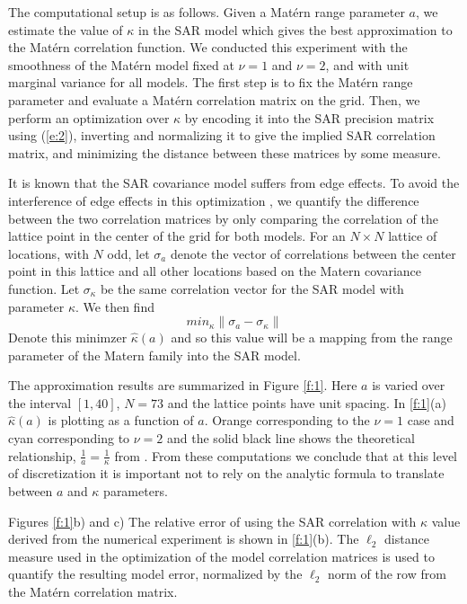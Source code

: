 \documentclass[review]{elsarticle}
\begin{document}
The  computational setup is as follows. Given a Mat\'ern range parameter $a$, we estimate the value of  $\kappa$ in the SAR model which gives the best approximation to the Mat\'ern correlation function.  We conducted this experiment with the smoothness of the Mat\'ern model fixed at $\nu=1$ and $\nu=2$, and with unit marginal variance for all models. The first step is to fix the Mat\'ern range parameter and evaluate a Mat\'ern correlation matrix on the grid. Then, we perform an optimization over $\kappa$ by encoding it into the SAR precision matrix using (\ref{e:2}), inverting and normalizing it to give the implied SAR correlation matrix, and minimizing the distance between these matrices by some measure.

It is known that the SAR covariance model suffers from edge effects. To avoid the interference of edge effects in this optimization , we quantify the difference between the two correlation matrices by only comparing the correlation of the lattice point  in the center of the grid for both models. 
For an $N \times N$ lattice of locations, with $N$ odd,  let  $\sigma_a$ denote the  vector of correlations between the center point in this lattice  and all other locations based on the Matern covariance function.  Let  $\sigma_\kappa$ be the same  correlation vector for the SAR model with parameter $\kappa$.  We then find \[ min_{\kappa} \| \sigma_a - \sigma_\kappa \| \]
Denote this minimzer $\hat{\kappa}( a)$ and so this value will be a mapping from the range parameter
of the Matern family into the SAR model. 


The approximation results are summarized in Figure \ref{f:1}. Here $a$ is varied over the interval $[1, 40]$, $N=73$ and the lattice points have unit spacing.  In \ref{f:1}(a)  $\hat{\kappa}( a)$  is plotting as a function of $a$. Orange corresponding to the $\nu=1$ case and cyan corresponding to $\nu=2$ and the solid black line shows the theoretical relationship, $\frac{1}{a} = \frac{1}{\kappa}$ from \cite{lindgren2011explicit}.  From these computations we conclude that at this level of discretization it is important not to rely on the analytic formula to translate between $a$ and $\kappa$ parameters. 


Figures   \ref{f:1}b) and c)  The relative error of using the SAR correlation with $\kappa$ value derived from the numerical experiment is shown in \ref{f:1}(b). The $\ell_2$ distance measure used in the optimization of the model correlation matrices is used to quantify the resulting model error, normalized by the $\ell_2$ norm of the row from the Mat\'ern correlation matrix.
\end{document}
